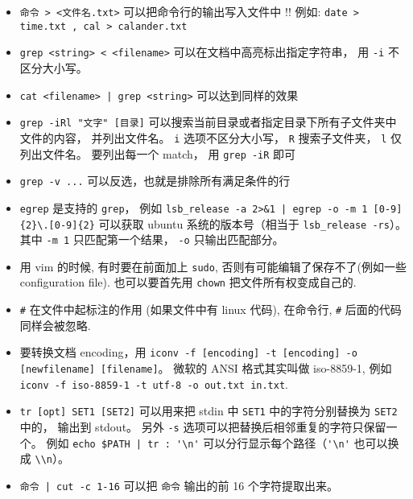 \begin{itemize}
\item \verb`命令 > <文件名.txt>` 可以把命令行的输出写入文件中 !! 例如: \verb`date > time.txt , cal > calander.txt`
\item \verb`grep <string> < <filename>` 可以在文档中高亮标出指定字符串， 用 \verb`-i` 不区分大小写。
\item \verb`cat <filename> | grep <string>` 可以达到同样的效果
\item \verb`grep -iRl "文字" [目录]` 可以搜索当前目录或者指定目录下所有子文件夹中文件的内容， 并列出文件名。 \verb`i` 选项不区分大小写， \verb`R` 搜索子文件夹， \verb`l` 仅列出文件名。 要列出每一个 match， 用 \verb`grep -iR` 即可
\item \verb`grep -v ...` 可以反选，也就是排除所有满足条件的行
\item \verb`egrep` 是支持的 \verb`grep`， 例如 \verb`lsb_release -a 2>&1 | egrep -o -m 1 [0-9]{2}\.[0-9]{2}` 可以获取 ubuntu 系统的版本号（相当于 \verb`lsb_release -rs`）。 其中 \verb`-m 1` 只匹配第一个结果， \verb`-o` 只输出匹配部分。
\item 用 vim 的时候, 有时要在前面加上 \verb`sudo`, 否则有可能编辑了保存不了(例如一些 configuration file). 也可以要首先用 \verb`chown` 把文件所有权变成自己的.
\item \verb`#` 在文件中起标注的作用 (如果文件中有 linux 代码), 在命令行, \verb`#` 后面的代码同样会被忽略.
\item 要转换文档 encoding，用 \verb`iconv -f [encoding] -t [encoding] -o [newfilename] [filename]`。 微软的 ANSI 格式其实叫做 iso-8859-1, 例如 \verb`iconv -f iso-8859-1 -t utf-8 -o out.txt in.txt`.
\item \verb`tr [opt] SET1 [SET2]` 可以用来把 stdin 中 \verb`SET1` 中的字符分别替换为 \verb`SET2` 中的， 输出到 stdout。 另外 \verb`-s` 选项可以把替换后相邻重复的字符只保留一个。 例如 \verb`echo $PATH | tr : '\n'` 可以分行显示每个路径（\verb`'\n'` 也可以换成 \verb`\\n`）。
\item \verb`命令 | cut -c 1-16` 可以把 \verb`命令` 输出的前 16 个字符提取出来。
\end{itemize}

